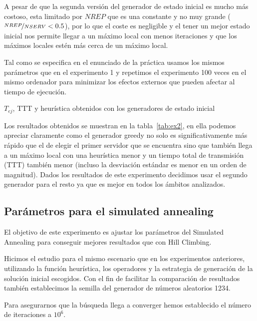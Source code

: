 A pesar de que la segunda versión del generador de estado inicial es mucho más costoso, esta limitado
por $NREP$ que es una constante y no muy grande ($\nicefrac{NREP}{NSERV} <0.5$), por lo que el coste es negligible
y el tener un mejor estado inicial nos permite llegar a un máximo local con menos iteraciones y que
los máximos locales estén más cerca de un máximo local.

Tal como se especifica en el enunciado de la práctica usamos los mismos parámetros que en el experimento
1 y repetimos el experimento 100 veces en el mismo ordenador para minimizar los efectos externos que
pueden afectar al tiempo de ejecución.

\begin{table}[H]
    \caption{$T_{ej}$, TTT y heurística obtenidos con los generadores de estado inicial}%
    \label{tab:ex2}
    \begin{center}
    
    \end{center}
\end{table}

Los resultados obtenidos se muestran en la tabla~\ref{tab:ex2}, en ella
podemos apreciar claramente como el generador greedy no solo es significativamente más rápido
que el de elegir el primer servidor que se encuentra sino que también llega a un máximo local con
una heurística menor y un tiempo total de transmisión (TTT) también menor (incluso la desviación
estándar es menor en un orden de magnitud).
Dados los resultados de este experimento decidimos usar el segundo generador para el resto ya que es
mejor en todos los ámbitos analizados.

\subsection{Parámetros para el simulated annealing}

El objetivo de este experimento es ajustar los parámetros del Simulated Annealing para conseguir mejores resultados que con Hill Climbing. 

Hicimos el estudio para el mismo escenario que en los experimentos anteriores, utilizando la función heurística, los operadores y la estrategia de generación de la solución inicial escogidos. Con el fin de facilitar la comparación de resultados también establecimos la semilla del generador de números aleatorios 1234.

Para asegurarnos que la búsqueda llega a converger hemos establecido el número de iteraciones a $10^6$.

